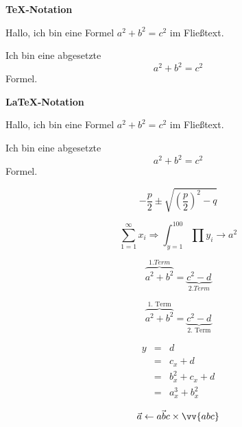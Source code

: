 \documentclass[12pt,ngerman,parskip=full]{scrartcl}
\begin{document}
\blindtext

\textbf{\TeX-Notation}

Hallo, ich bin eine Formel $a^2+b^2=c^2$ im Fließtext.

Ich bin eine abgesetzte $$a^2+b^2=c^2$$  Formel. 


\blindtext

\textbf{\LaTeX-Notation} %

Hallo, ich bin eine Formel \(a^2+b^2=c^2\) im Fließtext.

Ich bin eine abgesetzte \[a^2+b^2=c^2\]  Formel. 

\begin{equation}
-\frac{p}{2} \pm 
\sqrt{ 
 \left(
    \frac{p}{2}
 \right)^2 -q 
}
\end{equation}


\begin{equation}
\sum_{1=1}^\infty x_i \Rightarrow \int_{y=1}^{100} \prod y_i \rightarrow a^2
\end{equation}

\[ \overbrace{a^2 + b^2}^{1. Term} = \underbrace{c^2 - d}_{2. Term}\]

\[ \overbrace{a^2 + b^2}^{\text{1. Term}} = \underbrace{c^2 - d}_{\text{2. Term}}\]


\begin{eqnarray}
    y & = & d\\
     & = & c_x+d\\
     & = & b_x^{2}+c_x+d\\
     & = & a_x^{3}+b_x^{2}
\end{eqnarray}

\[
\vec{a} \leftarrow \vec{abc} \times \vv{abc} %
\]
\end{document}
